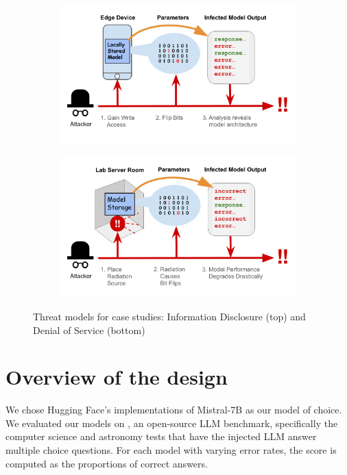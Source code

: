 \begin{figure}[!htbp]
    \centering
    \begin{subfigure}[b]{\linewidth}
        \centering
        \includegraphics[width=1.0\linewidth]{images/threat-case-1.png}
    \end{subfigure}
    \vspace{1cm}
    \begin{subfigure}[b]{\linewidth}
        \centering
        \includegraphics[width=1.0\linewidth]{images/threat-case-2.png}
    \end{subfigure}
    \caption{Threat models for case studies: Information Disclosure (top) and Denial of Service (bottom)}
    \label{fig:threatcases}
\end{figure}

\section{Overview of the design}
\label{sec:overview}

We chose Hugging Face's implementations of Mistral-7B \cite{jiang2023mistral7b} as our model of choice. We evaluated our models on \cite{hendrycks2021measuringmassivemultitasklanguage}, an open-source LLM benchmark, specifically the computer science and astronomy tests that have the injected LLM answer multiple choice questions. For each model with varying error rates, the score is computed as the proportions of correct answers.

